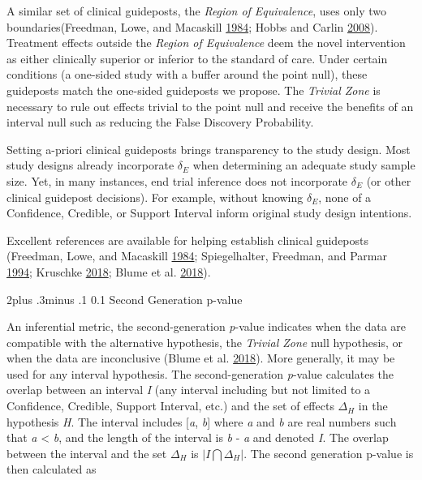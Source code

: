 \documentclass[12pt,oneside]{book}
\makeatletter
\newlength{\li}\setlength{\li}{14.48pt}
\newlength{\di}\setlength{\di}{-3.5mm}
\renewcommand\section{ \@startsection {section}{1}{\z@}%
    {2\@bls  plus .3\@bls minus .1\@bls}%
    {0.1\@bls}%
    {\centering\normalfont}}
\theoremstyle{definition}
\theoremstyle{definition}
\theoremstyle{definition}
\theoremstyle{remark}
\makeatother
\begin{document}
A similar set of clinical guideposts, the \emph{Region of Equivalence},
uses only two boundaries(Freedman, Lowe, and Macaskill
\protect\hyperlink{ref-Freedman:1984wz}{1984}; Hobbs and Carlin
\protect\hyperlink{ref-Hobbs:2008ce}{2008}). Treatment effects outside
the \emph{Region of Equivalence} deem the novel intervention as either
clinically superior or inferior to the standard of care. Under certain
conditions (a one-sided study with a buffer around the point null),
these guideposts match the one-sided guideposts we propose. The
\emph{Trivial Zone} is necessary to rule out effects trivial to the
point null and receive the benefits of an interval null such as reducing
the False Discovery Probability.

Setting a-priori clinical guideposts brings transparency to the study
design. Most study designs already incorporate \(\delta_E\) when
determining an adequate study sample size. Yet, in many instances, end
trial inference does not incorporate \(\delta_E\) (or other clinical
guidepost decisions). For example, without knowing \(\delta_E\), none of
a Confidence, Credible, or Support Interval inform original study design
intentions.

Excellent references are available for helping establish clinical
guideposts (Freedman, Lowe, and Macaskill
\protect\hyperlink{ref-Freedman:1984wz}{1984}; Spiegelhalter, Freedman,
and Parmar \protect\hyperlink{ref-Spiegelhalter:1994cn}{1994}; Kruschke
\protect\hyperlink{ref-Kruschke:2018bz}{2018}; Blume et al.
\protect\hyperlink{ref-Blume:SGPV}{2018}).

\hypertarget{second-generation-p-value}{%
\section{Second Generation p-value}\label{second-generation-p-value}}

An inferential metric, the second-generation \emph{p}-value indicates
when the data are compatible with the alternative hypothesis, the
\emph{Trivial Zone} null hypothesis, or when the data are inconclusive
(Blume et al. \protect\hyperlink{ref-Blume:SGPV}{2018}). More generally,
it may be used for any interval hypothesis. The second-generation
\emph{p}-value calculates the overlap between an interval \emph{I} (any
interval including but not limited to a Confidence, Credible, Support
Interval, etc.) and the set of effects \(\Delta_H\) in the hypothesis
\emph{H}. The interval includes {[}\emph{a}, \emph{b}{]} where \emph{a}
and \emph{b} are real numbers such that \emph{a} \textless{} \emph{b},
and the length of the interval is \emph{b} - \emph{a} and denoted
\textbar{}\emph{I}\textbar{}. The overlap between the interval and the
set \(\Delta_H\) is \(|I \bigcap \Delta_H |\). The second generation
p-value is then calculated as
\end{document}
